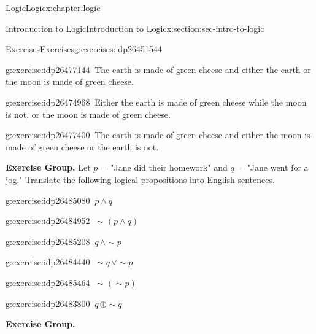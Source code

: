 \documentclass[twoside,10pt,]{book}
\numberwithin{equation}{section}
\begin{document}
\begin{chapterptx}{Logic}{}{Logic}{}{}{x:chapter:logic}
\begin{sectionptx}{Introduction to Logic}{}{Introduction to Logic}{}{}{x:section:sec-intro-to-logic}
\begin{exercises-subsection}{Exercises}{}{Exercises}{}{}{g:exercises:idp26451544}
\begin{exercisegroup}
\begin{divisionexerciseeg}{18}{}{}{g:exercise:idp26477144}%
\(\ \)The earth is made of green cheese and either the earth or the moon is made of green cheese.\end{divisionexerciseeg}%
\begin{divisionexerciseeg}{19}{}{}{g:exercise:idp26474968}%
\(\ \)Either the earth is made of green cheese while the moon is not, or the moon is made of green cheese.\end{divisionexerciseeg}%
\begin{divisionexerciseeg}{20}{}{}{g:exercise:idp26477400}%
\(\ \)The earth is made of green cheese and either the moon is made of green cheese or the earth is not.\end{divisionexerciseeg}%
\end{exercisegroup}
\par\medskip\noindent
\par\medskip\noindent%
\textbf{Exercise Group.}\space\space%
Let \(p=\,\)"Jane did their homework" and \(q=\,\)"Jane went for a jog."  Translate the following logical propositions into English sentences.\begin{exercisegroup}
\begin{divisionexerciseeg}{21}{}{}{g:exercise:idp26485080}%
\(\ p{\wedge} q\)\end{divisionexerciseeg}%
\begin{divisionexerciseeg}{22}{}{}{g:exercise:idp26484952}%
\(\ \sim\!(p{\wedge} q)\)\end{divisionexerciseeg}%
\begin{divisionexerciseeg}{23}{}{}{g:exercise:idp26485208}%
\(\ q\,{\wedge}\sim\!{p}\)\end{divisionexerciseeg}%
\begin{divisionexerciseeg}{24}{}{}{g:exercise:idp26484440}%
\(\ \sim\!{q}\,{\vee} \sim\!{p}\)\end{divisionexerciseeg}%
\begin{divisionexerciseeg}{25}{}{}{g:exercise:idp26485464}%
\(\ \sim\!(\sim\!{p})\)\end{divisionexerciseeg}%
\begin{divisionexerciseeg}{26}{}{}{g:exercise:idp26483800}%
\(\ q\,{\oplus}\sim\!{q}\)\end{divisionexerciseeg}%
\end{exercisegroup}
\par\medskip\noindent
\par\medskip\noindent%
\textbf{Exercise Group.}\space\space%

\end{exercises-subsection}
\end{sectionptx}
\end{chapterptx}
\end{document}
